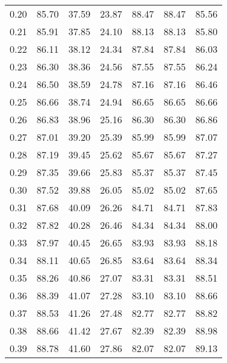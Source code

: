 \begin{tabular}{|c|c|c|c|c|c|c|}
      0.20 &     85.70 &     37.59 &      23.87 &   88.47 &      88.47 &         85.56 \\
      0.21 &     85.91 &     37.85 &      24.10 &   88.13 &      88.13 &         85.80 \\
      0.22 &     86.11 &     38.12 &      24.34 &   87.84 &      87.84 &         86.03 \\
      0.23 &     86.30 &     38.36 &      24.56 &   87.55 &      87.55 &         86.24 \\
      0.24 &     86.50 &     38.59 &      24.78 &   87.16 &      87.16 &         86.46 \\
      0.25 &     86.66 &     38.74 &      24.94 &   86.65 &      86.65 &         86.66 \\
      0.26 &     86.83 &     38.96 &      25.16 &   86.30 &      86.30 &         86.86 \\
      0.27 &     87.01 &     39.20 &      25.39 &   85.99 &      85.99 &         87.07 \\
      0.28 &     87.19 &     39.45 &      25.62 &   85.67 &      85.67 &         87.27 \\
      0.29 &     87.35 &     39.66 &      25.83 &   85.37 &      85.37 &         87.45 \\
      0.30 &     87.52 &     39.88 &      26.05 &   85.02 &      85.02 &         87.65 \\
      0.31 &     87.68 &     40.09 &      26.26 &   84.71 &      84.71 &         87.83 \\
      0.32 &     87.82 &     40.28 &      26.46 &   84.34 &      84.34 &         88.00 \\
      0.33 &     87.97 &     40.45 &      26.65 &   83.93 &      83.93 &         88.18 \\
      0.34 &     88.11 &     40.65 &      26.85 &   83.64 &      83.64 &         88.34 \\
      0.35 &     88.26 &     40.86 &      27.07 &   83.31 &      83.31 &         88.51 \\
      0.36 &     88.39 &     41.07 &      27.28 &   83.10 &      83.10 &         88.66 \\
      0.37 &     88.53 &     41.26 &      27.48 &   82.77 &      82.77 &         88.82 \\
      0.38 &     88.66 &     41.42 &      27.67 &   82.39 &      82.39 &         88.98 \\
      0.39 &     88.78 &     41.60 &      27.86 &   82.07 &      82.07 &         89.13 \\

\end{tabular}

